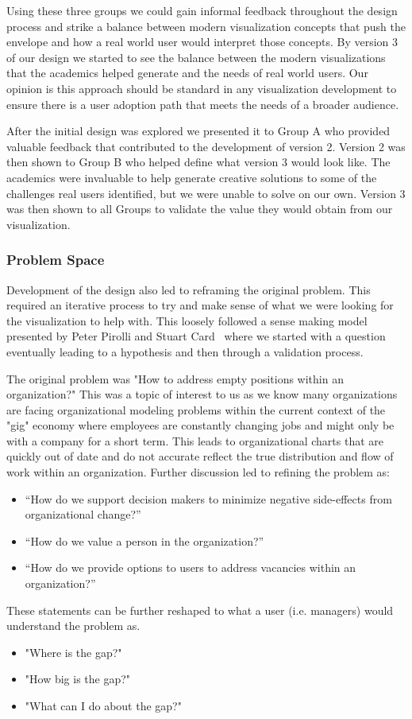 \message{ !name(FinalPaper.tex)}\documentclass[journal]{vgtc}                %
\begin{document}
Using these three groups we could gain informal feedback throughout the design process and strike a balance between modern visualization concepts that push the envelope and how a real world user would interpret those concepts.  By version 3 of our design we started to see the balance between the modern visualizations that the academics helped generate and the needs of real world users.  Our opinion is this approach should be standard in any visualization development to ensure there is a user adoption path that meets the needs of a broader audience.

After the initial design was explored we presented it to Group A who provided valuable feedback that contributed to the development of version 2.  Version 2 was then shown to Group B who helped define what version 3 would look like.  The academics were invaluable to help generate creative solutions to some of the challenges real users identified, but we were unable to solve on our own.  Version 3 was then shown to all Groups to validate the value they would obtain from our visualization.

\subsubsection{Problem Space}
Development of the design also led to reframing the original problem.  This required an iterative process to try and make sense of what we were looking for the visualization to help with.  This loosely followed a sense making model presented by Peter Pirolli and Stuart Card~\cite{pirolli2005sensemaking} where we started with a question eventually leading to a hypothesis and then through a validation process.  

The original problem was "How to address empty positions within an organization?"  This was a topic of interest to us as we know many organizations are facing organizational modeling problems within the current context of the "gig" economy where employees are constantly changing jobs and might only be with a company for a short term.  This leads to organizational charts that are quickly out of date and do not accurate reflect the true distribution and flow of work within an organization.  
Further discussion led to refining the problem as:
\begin{itemize}
\item “How do we support decision makers to minimize negative side-effects from organizational change?”
\item “How do we value a person in the organization?”
\item “How do we provide options to users to address vacancies within an organization?”
\end{itemize}
These statements can be further reshaped to what a user (i.e. managers) would understand the problem as.
\begin{itemize}
\item "Where is the gap?"
\item "How big is the gap?"
\item "What can I do about the gap?"
\end{itemize}
\end{document}
